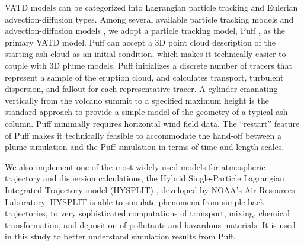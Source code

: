 \documentclass[utf8]{frontiersSCNS} %
\begin{document}
VATD models can be categorized into Lagrangian particle tracking and Eulerian advection-diffusion types. Among several available particle tracking models \citep[e.g.][]{walko1995hypact, searcy1998puff, d1998modeling, draxler1998overview} and advection-diffusion models \citep[e.g.][]{bonadonna2005total, folch2009fall3d, schwaiger2012ash3d}, we adopt a particle tracking model, Puff \citep{tanaka1991development,searcy1998puff}, as the primary VATD model. Puff can accept a 3D point cloud description of the starting ash cloud as an initial condition, which makes it technically easier to couple with 3D plume models. Puff initializes a discrete number of tracers that represent a sample of the eruption cloud, and calculates transport, turbulent dispersion, and fallout for each representative tracer. A cylinder emanating vertically from the volcano summit to a specified maximum height is the standard approach to provide a simple model of the geometry of a typical ash column. Puff minimally requires horizontal wind field data. The ``restart'' feature of Puff makes it technically feasible to accommodate the hand-off between a plume simulation and the Puff simulation in terms of time and length scales.

We also implement one of the most widely used models for atmospheric trajectory and dispersion calculations, the Hybrid Single-Particle Lagrangian Integrated Trajectory model (HYSPLIT) \citep{stein2015noaa, rolph2017real}, developed by NOAA's Air Resources Laboratory. HYSPLIT is able to simulate phenomena from simple back trajectories, to very sophisticated computations of transport, mixing, chemical transformation, and deposition of pollutants and hazardous materials. It  is used in this study to better understand simulation results from Puff.
\end{document}
